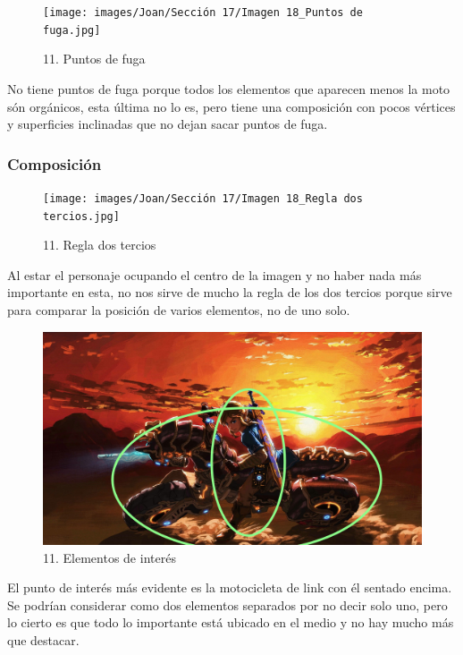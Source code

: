 \documentclass[12pt]{article}
\begin{document}
        \begin{figure}[H]
          \centering
          \texttt{[image: images/Joan/Sección 17/Imagen 18\_Puntos de fuga.jpg]}
          \caption{\small 11. Puntos de fuga}
        \end{figure}
        No tiene puntos de fuga porque todos los elementos que aparecen menos la moto són orgánicos, esta última no lo es, pero tiene una composición con pocos vértices y superficies inclinadas que no dejan sacar puntos de fuga. 

            \subsubsection{Composición}
            \begin{figure}[H]
          \centering
          \texttt{[image: images/Joan/Sección 17/Imagen 18\_Regla dos tercios.jpg]}
          \caption{\small 11. Regla dos tercios}
        \end{figure}
        Al estar el personaje ocupando el centro de la imagen y no haber nada más importante en esta, no nos sirve de mucho la regla de los dos tercios porque sirve para comparar la posición de varios elementos, no de uno solo. 

        \begin{figure}[H]
          \centering
          \includegraphics[width=\textwidth]{images/Joan/Sección 17/Imagen 18_Elementos de interés.jpg}
          \caption{\small 11. Elementos de interés}
        \end{figure}
        El punto de interés más evidente es la motocicleta de link con él sentado encima. Se podrían considerar como dos elementos separados por no decir solo uno, pero lo cierto es que todo lo importante está ubicado en el medio y no hay mucho más que destacar. 
\end{document}
